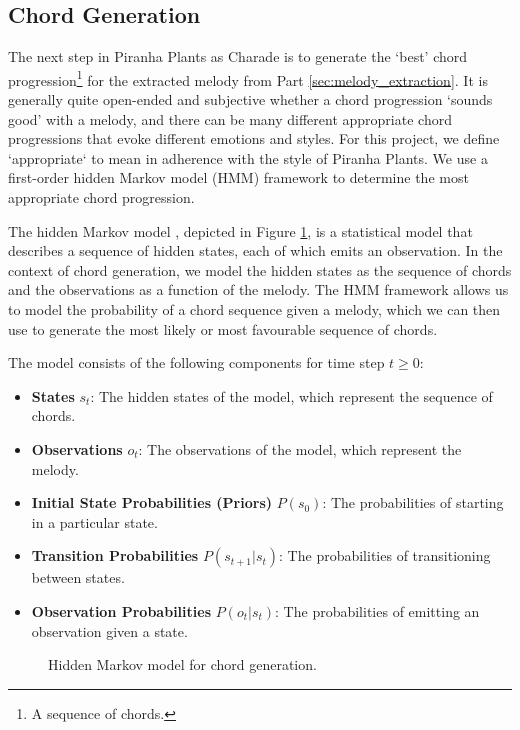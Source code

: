 \subsection{Chord Generation}
\label{sec:chord_generation}

The next step in Piranha Plants as Charade is to generate the `best' chord progression\footnote{A sequence of chords.} for the extracted melody from Part \ref{sec:melody_extraction}. It is generally quite open-ended and subjective whether a chord progression `sounds good' with a melody, and there can be many different appropriate chord progressions that evoke different emotions and styles. For this project, we define `appropriate` to mean in adherence with the style of Piranha Plants. We use a first-order hidden Markov model (HMM) framework to determine the most appropriate chord progression.

The hidden Markov model \autocite{HMM:2023,SpeechLang:2025}, depicted in Figure \ref{fig:hmm}, is a statistical model that describes a sequence of hidden states, each of which emits an observation. In the context of chord generation, we model the hidden states as the sequence of chords and the observations as a function of the melody. The HMM framework allows us to model the probability of a chord sequence given a melody, which we can then use to generate the most likely or most favourable sequence of chords.

The model consists of the following components for time step $t \geq 0$:
\begin{itemize}
    \item \textbf{States} $s_t$: The hidden states of the model, which represent the sequence of chords.
    \item \textbf{Observations} $o_t$: The observations of the model, which represent the melody.
    \item \textbf{Initial State Probabilities (Priors)} $P(s_0)$: The probabilities of starting in a particular state.
    \item \textbf{Transition Probabilities} $P(s_{t+1} | s_t)$: The probabilities of transitioning between states.
    \item \textbf{Observation Probabilities} $P(o_t | s_t)$: The probabilities of emitting an observation given a state.
\end{itemize}

\begin{figure}
    \resizebox{\linewidth}{!}{}
    \caption{Hidden Markov model for chord generation.}
    \label{fig:hmm}
\end{figure}

